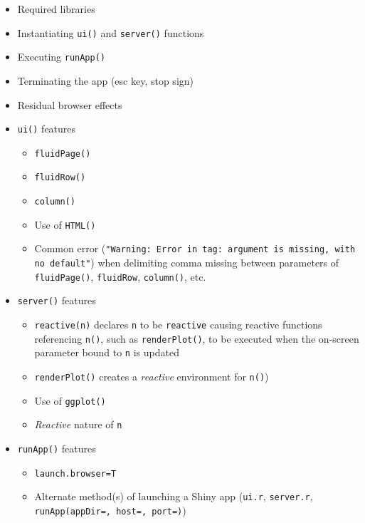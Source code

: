 \documentclass[10pt, letterpaper]{article}
\begin{document}
\begin{spacing}{1.0}
\begin{itemize}
    \item Required libraries
    \item Instantiating \texttt{ui()} and \texttt{server()} functions
    \item Executing \texttt{runApp()}
    \item Terminating the app (esc key, stop sign)
    \item Residual browser effects
    \item \texttt{ui()} features
      \begin{itemize}
          \item \texttt{fluidPage()}
          \item \texttt{fluidRow()}
          \item \texttt{column()}
          \item Use of \texttt{HTML()}
          \item Common error (\texttt{"Warning: Error in tag: argument is missing, with no default"}) when delimiting comma missing between parameters of \texttt{fluidPage()}, \texttt{fluidRow}, \texttt{column()}, etc.  
      \end{itemize}
    \item \texttt{server()} features
      \begin{itemize}
          \item \texttt{reactive(n)} declares \texttt{n} to be \texttt{reactive} causing reactive functions referencing \texttt{n()}, such as \texttt{renderPlot()}, to be executed when the on-screen parameter bound to \texttt{n} is updated  
          \item \texttt{renderPlot()} creates a \textit{reactive} environment for \texttt{n()})
          \item Use of \texttt{ggplot()}
          \item \textit{Reactive} nature of \texttt{n}
      \end{itemize}
    \item \texttt{runApp()} features
      \begin{itemize}
          \item \texttt{launch.browser=T}
          \item Alternate method(s) of launching a Shiny app (\texttt{ui.r}, \texttt{server.r}, \texttt{runApp(appDir=, host=, port=)})
      \end{itemize}
\end{itemize}



\end{spacing}
\end{document}
